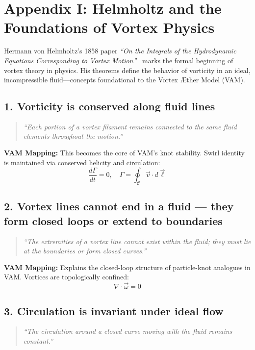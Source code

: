 \documentclass[preprint,notitlepage]{revtex4-2}
\begin{document}
\appendix
\section*{Appendix I: Helmholtz and the Foundations of Vortex Physics}
\label{appendix:helmholtz}

    Hermann von Helmholtz’s 1858 paper \textit{“On the Integrals of the Hydrodynamic Equations Corresponding to Vortex Motion”}~\cite{helmholtz1858vortices} marks the formal beginning of vortex theory in physics. His theorems define the behavior of vorticity in an ideal, incompressible fluid—concepts foundational to the Vortex Æther Model (VAM).

    \subsection*{1. Vorticity is conserved along fluid lines}
    \begin{quote}
    \textit{“Each portion of a vortex filament remains connected to the same fluid elements throughout the motion.”}
    \end{quote}

    \textbf{VAM Mapping:} This becomes the core of VAM’s knot stability. Swirl identity is maintained via conserved helicity and circulation:
    \[
    \frac{d\Gamma}{dt} = 0, \quad \Gamma = \oint_{\mathcal{C}} \vec{v} \cdot d\vec{\ell}
    \]

    \subsection*{2. Vortex lines cannot end in a fluid — they form closed loops or extend to boundaries}
    \begin{quote}
    \textit{“The extremities of a vortex line cannot exist within the fluid; they must lie at the boundaries or form closed curves.”}
    \end{quote}

    \textbf{VAM Mapping:} Explains the closed-loop structure of particle-knot analogues in VAM. Vortices are topologically confined:
    \[
    \nabla \cdot \vec{\omega} = 0
    \]

    \subsection*{3. Circulation is invariant under ideal flow}
    \begin{quote}
    \textit{“The circulation around a closed curve moving with the fluid remains constant.”}
    \end{quote}
\end{document}
